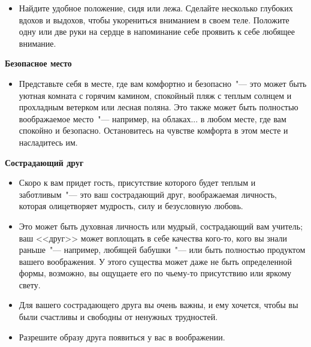 \begin{itemize}
	\item Найдите удобное положение, сидя или лежа. Сделайте несколько глубоких вдохов и выдохов, чтобы укорениться вниманием в своем теле. Положите одну или две руки на сердце в напоминание себе проявить к себе любящее внимание.
\end{itemize}

\vspace{3ex}

{\large \textbf{Безопасное место}}
\begin{itemize}
	\item Представьте себя в месте, где вам комфортно и безопасно~"--- это может быть уютная комната с горячим камином, спокойный пляж с теплым солнцем и прохладным ветерком или лесная поляна. Это также может быть полностью воображаемое место~"--- например, на облаках... в любом месте, где вам спокойно и безопасно. Остановитесь на чувстве комфорта в этом месте и насладитесь им.
\end{itemize}

\vspace{3ex}

{\large \textbf{Сострадающий друг}}
\begin{itemize}
	\item Скоро к вам придет гость, присутствие которого будет теплым и заботливым~"--- это ваш сострадающий друг, воображаемая личность, которая олицетворяет мудрость, силу и безусловную любовь.
	
	\item Это может быть духовная личность или мудрый, сострадающий вам учитель; ваш <<друг>> может воплощать в себе качества кого-то, кого вы знали раньше~"--- например, любящей бабушки~"--- или быть полностью продуктом вашего воображения. У этого существа может даже не быть определенной формы, возможно, вы ощущаете его по чьему-то присутствию или яркому свету.
	
	\item Для вашего сострадающего друга вы очень важны, и ему хочется, чтобы вы были счастливы и свободны от ненужных трудностей.
	
	\item Разрешите образу друга появиться у вас в воображении.
\end{itemize}

\vspace{3ex}

